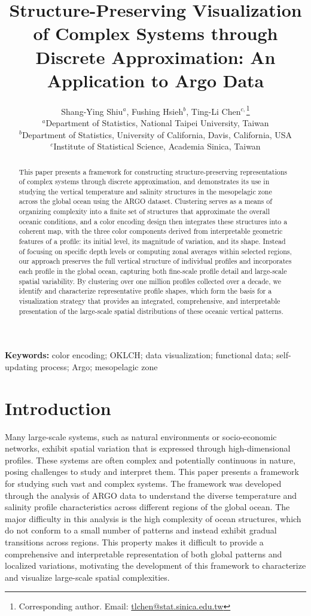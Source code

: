 \documentclass[11pt]{article}
\title{Structure-Preserving Visualization of Complex Systems through Discrete Approximation: An Application to Argo Data}
\author{Shang-Ying Shiu$^{a}$, \quad Fushing Hsieh$^{b}$, \quad Ting-Li Chen$^{c,}$\thanks{Corresponding author. Email: \href{mailto:tlchen@stat.sinica.edu.tw}{tlchen@stat.sinica.edu.tw}}\\[1ex]
{\small $^{a}$Department of Statistics, National Taipei University, Taiwan}\\
{\small $^{b}$Department of Statistics, University of California, Davis, California, USA}\\
{\small $^{c}$Institute of Statistical Science, Academia Sinica, Taiwan}}
\date{}
\theoremstyle{plain}
\begin{document}
\maketitle

\begin{abstract}
This paper presents a framework for constructing structure-preserving representations of complex systems through discrete approximation, and demonstrates its use in studying the vertical temperature and salinity structures in the mesopelagic zone across the global ocean using the ARGO dataset. Clustering serves as a means of organizing complexity into a finite set of structures that approximate the overall oceanic conditions, and a color encoding design then integrates these structures into a coherent map, with the three color components derived from interpretable geometric features of a profile: its initial level, its magnitude of variation, and its shape. Instead of focusing on specific depth levels or computing zonal averages within selected regions, our approach preserves the full vertical structure of individual profiles and incorporates each profile in the global ocean, capturing both fine-scale profile detail and large-scale spatial variability. By clustering over one million profiles collected over a decade, we identify and characterize representative profile shapes, which form the basis for a visualization strategy that provides an integrated, comprehensive, and interpretable presentation of the large-scale spatial distributions of these oceanic vertical patterns.
\end{abstract}

\noindent\textbf{Keywords:} color encoding; OKLCH; data visualization; functional data; self-updating process; Argo; mesopelagic zone


\section{Introduction}
\label{sec:intro}
Many large-scale systems, such as natural environments or socio-economic networks, exhibit spatial variation that is expressed through high-dimensional profiles. These systems are often complex and potentially continuous in nature, posing challenges to study and interpret them. This paper presents a framework for studying such vast and complex systems. The framework was developed through the analysis of ARGO data \citep{argo2000argo} to understand the diverse temperature and salinity profile characteristics across different regions of the global ocean. The major difficulty in this analysis is the high complexity of ocean structures, which do not conform to a small number of patterns and instead exhibit gradual transitions across regions. This property makes it difficult to provide a comprehensive and interpretable representation of both global patterns and localized variations, motivating the development of this framework to characterize and visualize large-scale spatial complexities.
\end{document}
